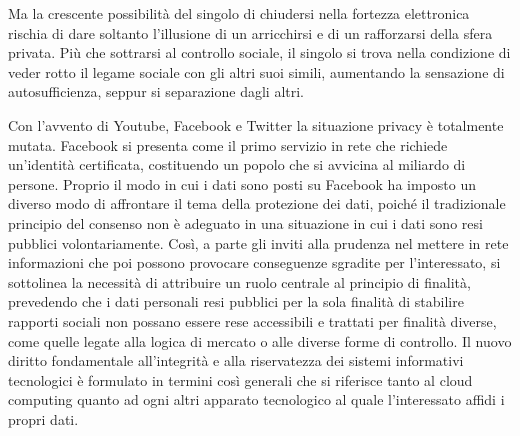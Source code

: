 Ma la crescente possibilità del singolo di chiudersi nella fortezza elettronica rischia di dare soltanto l’illusione di un arricchirsi e di un rafforzarsi della sfera privata. Più che sottrarsi al controllo sociale, il singolo si trova nella condizione di veder rotto il legame sociale con gli altri suoi simili, aumentando la sensazione di autosufficienza, seppur si separazione dagli altri.





Con l’avvento di Youtube, Facebook e Twitter la situazione privacy è totalmente mutata. Facebook si presenta come il primo servizio in rete che richiede un’identità certificata, costituendo un popolo che si avvicina al miliardo di persone. Proprio il modo in cui i dati sono posti su Facebook ha imposto un diverso modo di affrontare il tema della protezione dei dati, poiché il tradizionale principio del consenso non è adeguato in una situazione in cui i dati sono resi pubblici volontariamente. Così, a parte gli inviti alla prudenza nel mettere in rete informazioni che poi possono provocare conseguenze sgradite per l’interessato, si sottolinea la necessità di attribuire un ruolo centrale al principio di finalità, prevedendo che i dati personali resi pubblici per la sola finalità di stabilire rapporti sociali non possano essere rese accessibili e trattati per finalità diverse, come quelle legate alla logica di mercato o alle diverse forme di controllo.
Il nuovo diritto fondamentale all’integrità e alla riservatezza dei sistemi informativi tecnologici è formulato in termini così generali che si riferisce tanto al cloud computing quanto ad ogni altri apparato tecnologico al quale l’interessato affidi i propri dati.

